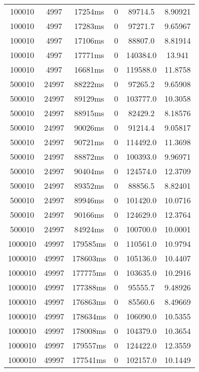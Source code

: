 \documentclass[./main.tex]{subfiles}
\begin{document}
\begin{table}
\begin{tabular}{ c | c | c | c | c | c }
        100010 & 4997 & 17254ms & 0 & 89714.5 & 8.90921 \\
        100010 & 4997 & 17283ms & 0 & 97271.7 & 9.65967 \\
        100010 & 4997 & 17106ms & 0 & 88807.0 & 8.81914 \\
        100010 & 4997 & 17771ms & 0 & 140384.0 & 13.941 \\
        100010 & 4997 & 16681ms & 0 & 119588.0 & 11.8758 \\
        \hline
        500010 & 24997 & 88222ms & 0 & 97265.2 & 9.65908 \\
        500010 & 24997 & 89129ms & 0 & 103777.0 & 10.3058 \\
        500010 & 24997 & 88915ms & 0 & 82429.2 & 8.18576 \\
        500010 & 24997 & 90026ms & 0 & 91214.4 & 9.05817 \\
        500010 & 24997 & 90721ms & 0 & 114492.0 & 11.3698 \\
        500010 & 24997 & 88872ms & 0 & 100393.0 & 9.96971 \\
        500010 & 24997 & 90404ms & 0 & 124574.0 & 12.3709 \\
        500010 & 24997 & 89352ms & 0 & 88856.5 & 8.82401 \\
        500010 & 24997 & 89946ms & 0 & 101420.0 & 10.0716 \\
        500010 & 24997 & 90166ms & 0 & 124629.0 & 12.3764 \\
        \rowcolor{lightgray} 500010 & 24997 & 84924ms & 0 & 100700.0 & 10.0001 \\
        \hline
        1000010 & 49997 & 179585ms & 0 & 110561.0 & 10.9794 \\
        1000010 & 49997 & 178603ms & 0 & 105136.0 & 10.4407 \\
        \rowcolor{lightgray} 1000010 & 49997 & 177775ms & 0 & 103635.0 & 10.2916 \\
        1000010 & 49997 & 177388ms & 0 & 95555.7 & 9.48926 \\
        1000010 & 49997 & 176863ms & 0 & 85560.6 & 8.49669 \\
        1000010 & 49997 & 178634ms & 0 & 106090.0 & 10.5355 \\
        1000010 & 49997 & 178008ms & 0 & 104379.0 & 10.3654 \\
        1000010 & 49997 & 179557ms & 0 & 124422.0 & 12.3559 \\
        1000010 & 49997 & 177541ms & 0 & 102157.0 & 10.1449 \\

\end{tabular}
\end{table}
\end{document}
